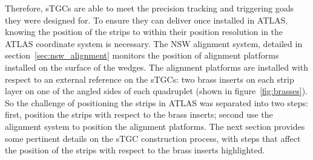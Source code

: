 Therefore, sTGCs are able to meet the precision tracking and triggering goals they were designed for. To ensure they can deliver once installed in ATLAS, knowing the position of the strips to within their position resolution in the ATLAS coordinate system is necessary. The NSW alignment system, detailed in section~\ref{sec:nsw_alignment} monitors the position of alignment platforms installed on the surface of the wedges. The alignment platforms are installed with respect to an external reference on the sTGCs: two brass inserts on each strip layer on one of the angled sides of each quadruplet (shown in figure~\ref{fig:brasses}). So the challenge of positioning the strips in ATLAS was separated into two steps: first, position the strips with respect to the brass inserts; second use the alignment system to position the alignment platforms. The next section provides some pertinent details on the sTGC construction process, with steps that affect the position of the strips with respect to the brass inserts highlighted.

